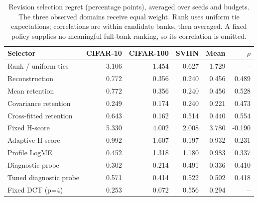 \begin{table}[tb]\centering\small
\caption{Revision selection regret (percentage points), averaged over seeds and budgets. The three observed domains receive equal weight. Rank uses uniform tie expectations; correlations are within candidate banks, then averaged. A fixed policy supplies no meaningful full-bank ranking, so its correlation is omitted.}\label{tab:revision}
\begin{tabular}{lrrrrr}\toprule
Selector & CIFAR-10 & CIFAR-100 & SVHN & Mean & $\rho$\\\midrule
Rank / uniform ties & 3.106 & 1.454 & 0.627 & 1.729 & --\\
Reconstruction & 0.772 & 0.356 & 0.240 & 0.456 & 0.489\\
Mean retention & 0.772 & 0.356 & 0.240 & 0.456 & 0.528\\
Covariance retention & 0.249 & 0.174 & 0.240 & 0.221 & 0.473\\
Cross-fitted retention & 0.643 & 0.162 & 0.514 & 0.440 & 0.554\\
Fixed H-score & 5.330 & 4.002 & 2.008 & 3.780 & -0.190\\
Adaptive H-score & 0.992 & 1.607 & 0.197 & 0.932 & 0.231\\
Profile LogME & 0.452 & 1.318 & 1.180 & 0.983 & 0.337\\
Diagnostic probe & 0.302 & 0.214 & 0.491 & 0.336 & 0.410\\
Tuned diagnostic probe & 0.571 & 0.414 & 0.522 & 0.502 & 0.418\\
Fixed DCT (p=4) & 0.253 & 0.072 & 0.556 & 0.294 & --\\
\bottomrule\end{tabular}
\end{table}
